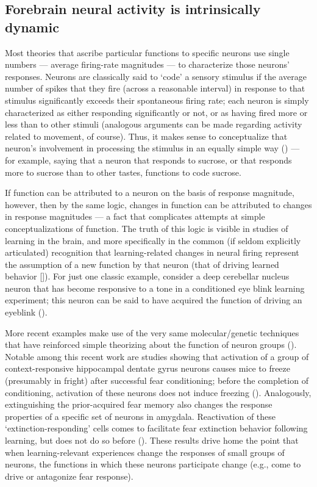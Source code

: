 \begin{refsection}
\section{Forebrain neural activity is intrinsically dynamic}
Most theories that ascribe particular functions to specific neurons use single numbers --- average firing-rate magnitudes --- to characterize those neurons’ responses. Neurons are classically said to ‘code’ a sensory stimulus if the average number of spikes that they fire (across a reasonable interval) in response to that stimulus significantly exceeds their spontaneous firing rate; each neuron is simply characterized as either responding significantly or not, or as having fired more or less than to other stimuli (analogous arguments can be made regarding activity related to movement, of course). Thus, it makes sense to conceptualize that neuron’s involvement in processing the stimulus in an equally simple way (\cite{chen2011a,hubel1995a,lavi2018a,mazurek2014a,steinmetz2019a,wang2018a}) --- for example, saying that a neuron that responds to sucrose, or that responds more to sucrose than to other tastes, functions to code sucrose.

If function can be attributed to a neuron on the basis of response magnitude, however, then by the same logic, changes in function can be attributed to changes in response magnitudes --- a fact that complicates attempts at simple conceptualizations of function. The truth of this logic is visible in studies of learning in the brain, and more specifically in the common (if seldom explicitly articulated) recognition that learning-related changes in neural firing represent the assumption of a new function by that neuron (that of driving learned behavior [\cite{banerjee2020a,barsy2020a,ross2018a}]). For just one classic example, consider a deep cerebellar nucleus neuron that has become responsive to a tone in a conditioned eye blink learning experiment; this neuron can be said to have acquired the function of driving an eyeblink (\cite{mm2017a}).

More recent examples make use of the very same molecular/genetic techniques that have reinforced simple theorizing about the function of neuron groups (\cite{aqrabawi2020a,butler2020a,josselyn2018a,josselyn2020a,sun2020a}). Notable among this recent work are studies showing that activation of a group of context-responsive hippocampal dentate gyrus neurons causes mice to freeze (presumably in fright) after successful fear conditioning; before the completion of conditioning, activation of these neurons does not induce freezing (\cite{ramirez2013a}). Analogously, extinguishing the prior-acquired fear memory also changes the response properties of a specific set of neurons in amygdala. Reactivation of these ‘extinction-responding’ cells comes to facilitate fear extinction behavior following learning, but does not do so before (\cite{zhang2020a}). These results drive home the point that when learning-relevant experiences change the responses of small groups of neurons, the functions in which these neurons participate change (e.g., come to drive or antagonize fear response).


\end{refsection}
